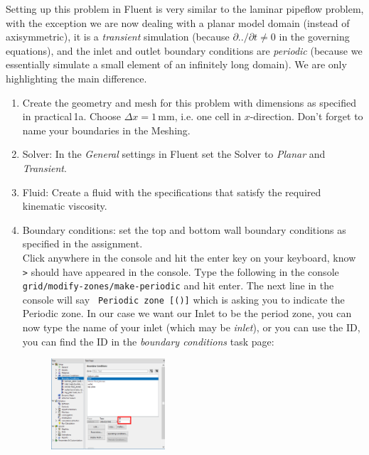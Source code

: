 \documentclass[11pt,a4paper,oneside,hidelinks]{scrartcl}
\begin{document}
Setting up this problem in Fluent is very similar to the laminar pipeflow problem, with the exception we are now dealing with a planar model domain (instead of axisymmetric), it is a \emph{transient} simulation (because $\partial ../\partial t\neq0$ in the governing equations), and the inlet and outlet boundary conditions are \emph{periodic} (because we essentially simulate a small element of an infinitely long domain). We are only highlighting the main difference.

\begin{enumerate}
\item Create the geometry and mesh for this problem with dimensions as specified in practical\,1a. Choose $\Delta x =1$\,mm, i.e. one cell in $x$-direction. Don't forget to name your boundaries in the Meshing.
\item Solver: In the \emph{General} settings in Fluent set the Solver to \emph{Planar} and \emph{Transient}.
\item Fluid: Create a fluid with the specifications that satisfy the required kinematic viscosity.
\item Boundary conditions: set the top and bottom wall boundary conditions as specified in the assignment. \\
    Click anywhere in the console and hit the enter key on your keyboard, know \texttt{>} should have appeared in the console. Type the following in the console \texttt{grid/modify-zones/make-periodic} and hit enter. The next line in the console will say \texttt{
Periodic zone [()]} which is asking you to indicate the Periodic zone. In our case we want our Inlet to be the period zone, you can now type the name of your inlet (which may be \emph{inlet}), or you can use the ID, you can find the ID in the \emph{boundary conditions} task page:
 \begin{figure}[H]
\begin{center}
\includegraphics[width=0.4\textwidth,clip]{BC_ID.png}
\end{center}
\end{figure}


\end{enumerate}
\end{document}
